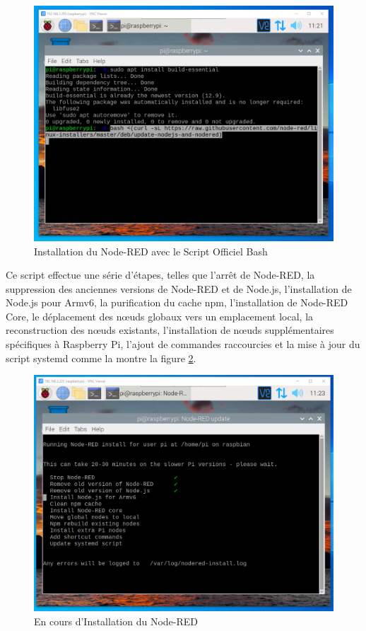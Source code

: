 \begin{figure}[H]
 \centering
    \includegraphics[width=15cm]{Images/NodeRedInstall1.png}
    \caption{Installation du Node-RED avec le Script Officiel Bash}
    \label{Chap4.3.2}
\end{figure}    

Ce script effectue une série d'étapes, telles que l'arrêt de Node-RED, la suppression des anciennes versions de Node-RED et de Node.js, l'installation de Node.js pour Armv6, la purification du cache npm, l'installation de Node-RED Core, le déplacement des nœuds globaux vers un emplacement local, la reconstruction des nœuds existants, l'installation de nœuds supplémentaires spécifiques à Raspberry Pi, l'ajout de commandes raccourcies et la mise à jour du script systemd comme la montre la figure \ref{Chap4.3.3}.

\begin{figure}[H]
 \centering
    \includegraphics[width=13cm]{Images/NodeRedInstall2.png}
    \caption{En cours d'Installation du Node-RED}
    \label{Chap4.3.3}
\end{figure}    

